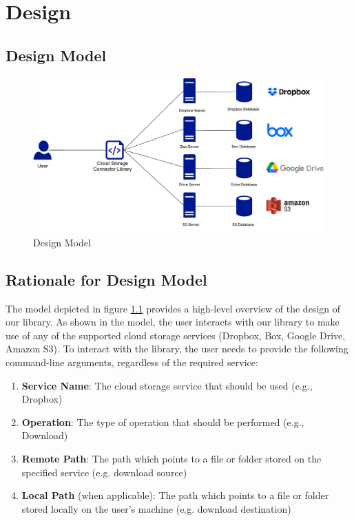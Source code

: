 \chapter{Design}

\section{Design Model}

\begin{figure} [h]
	\centering
	\includegraphics[scale=0.6]{images/design_diagram}
	\caption{\label{fig:design_model}Design Model}
\end{figure}

\section{Rationale for Design Model}
The model depicted in figure \ref{fig:design_model} provides a high-level overview of the design of our library. As shown in the model, the user interacts with our library to make use of any of the supported cloud storage services (Dropbox, Box, Google Drive, Amazon S3). To interact with the library, the user needs to provide the following command-line arguments, regardless of the required service:

\begin{enumerate}
	\item \textbf{Service Name}: The cloud storage service that should be used (e.g., Dropbox)
	
	\item \textbf{Operation}: The type of operation that should be performed (e.g., Download)
	
	\item \textbf{Remote Path}: The path which points to a file or folder stored on the specified service (e.g. download source)
	
	\item \textbf{Local Path} (when applicable): The path which points to a file or folder stored locally on the user's machine (e.g. download destination)
\end{enumerate}

